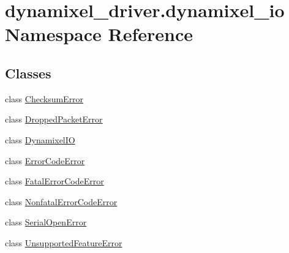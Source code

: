 \hypertarget{namespacedynamixel__driver_1_1dynamixel__io}{}\section{dynamixel\+\_\+driver.\+dynamixel\+\_\+io Namespace Reference}
\label{namespacedynamixel__driver_1_1dynamixel__io}
\subsection*{Classes}
\begin{DoxyCompactItemize}
\item 
class \hyperlink{classdynamixel__driver_1_1dynamixel__io_1_1_checksum_error}{Checksum\+Error}
\item 
class \hyperlink{classdynamixel__driver_1_1dynamixel__io_1_1_dropped_packet_error}{Dropped\+Packet\+Error}
\item 
class \hyperlink{classdynamixel__driver_1_1dynamixel__io_1_1_dynamixel_i_o}{Dynamixel\+IO}
\item 
class \hyperlink{classdynamixel__driver_1_1dynamixel__io_1_1_error_code_error}{Error\+Code\+Error}
\item 
class \hyperlink{classdynamixel__driver_1_1dynamixel__io_1_1_fatal_error_code_error}{Fatal\+Error\+Code\+Error}
\item 
class \hyperlink{classdynamixel__driver_1_1dynamixel__io_1_1_nonfatal_error_code_error}{Nonfatal\+Error\+Code\+Error}
\item 
class \hyperlink{classdynamixel__driver_1_1dynamixel__io_1_1_serial_open_error}{Serial\+Open\+Error}
\item 
class \hyperlink{classdynamixel__driver_1_1dynamixel__io_1_1_unsupported_feature_error}{Unsupported\+Feature\+Error}
\end{DoxyCompactItemize}
